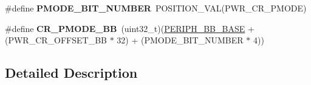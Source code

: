 \begin{DoxyCompactItemize}
\item 
\#define {\bfseries P\+M\+O\+D\+E\+\_\+\+B\+I\+T\+\_\+\+N\+U\+M\+B\+ER}~P\+O\+S\+I\+T\+I\+O\+N\+\_\+\+V\+AL(P\+W\+R\+\_\+\+C\+R\+\_\+\+P\+M\+O\+DE)\hypertarget{group___p_w_r___c_r__register__alias_gadcd5e2748a515ef914b84737e10ab061}{}\label{group___p_w_r___c_r__register__alias_gadcd5e2748a515ef914b84737e10ab061}

\item 
\#define {\bfseries C\+R\+\_\+\+P\+M\+O\+D\+E\+\_\+\+BB}~(uint32\+\_\+t)(\hyperlink{group___peripheral__memory__map_gaed7efc100877000845c236ccdc9e144a}{P\+E\+R\+I\+P\+H\+\_\+\+B\+B\+\_\+\+B\+A\+SE} + (P\+W\+R\+\_\+\+C\+R\+\_\+\+O\+F\+F\+S\+E\+T\+\_\+\+BB $\ast$ 32) + (P\+M\+O\+D\+E\+\_\+\+B\+I\+T\+\_\+\+N\+U\+M\+B\+ER $\ast$ 4))\hypertarget{group___p_w_r___c_r__register__alias_ga2e7c040f5c63f0fce3e274d9a03f1d1a}{}\label{group___p_w_r___c_r__register__alias_ga2e7c040f5c63f0fce3e274d9a03f1d1a}

\end{DoxyCompactItemize}


\subsection{Detailed Description}
